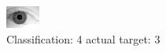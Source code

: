 \begin{figure}[h!]
\begin{center}
\includegraphics[width=0.60\columnwidth]{figures/ID2213_class_4_target_3.png}
\end{center}
\caption{ Classification: 4 actual target: 3}
\label{fig:ID2213_class_4_target_3}
\end{figure}
